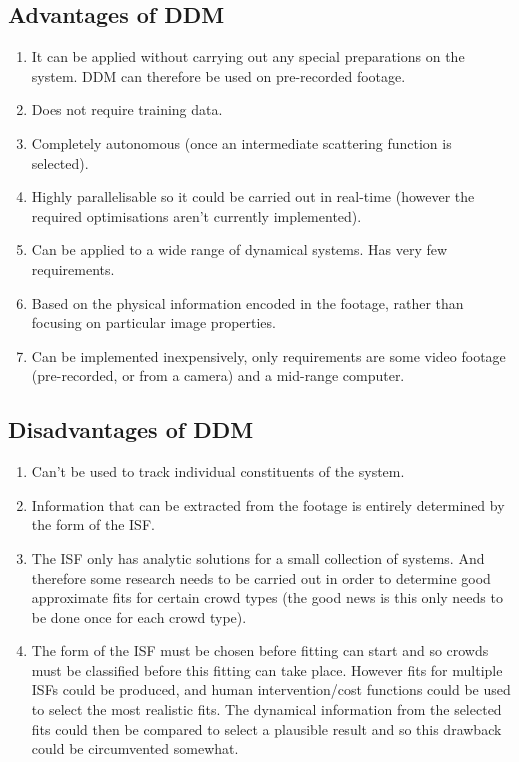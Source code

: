 \documentclass[10pt]{article}
\begin{document}
\subsection{Advantages of DDM}
\begin{enumerate}
\item It can be applied without carrying out any special preparations on the system. DDM can therefore be used on pre-recorded footage.
\item Does not require training data.
\item Completely autonomous (once an intermediate scattering function is selected).
\item Highly parallelisable so it could be carried out in real-time (however the required optimisations aren't currently implemented).
\item Can be applied to a wide range of dynamical systems. Has very few requirements.
\item Based on the physical information encoded in the footage, rather than focusing on particular image properties.
\item Can be implemented inexpensively, only requirements are some video footage (pre-recorded, or from a camera) and a mid-range computer.
\end{enumerate}

\subsection{Disadvantages of DDM}
\begin{enumerate}
\item Can't be used to track individual constituents of the system.
\item Information that can be extracted from the footage is entirely determined by the form of the ISF.
\item The ISF only has analytic solutions for a small collection of systems. And therefore some research needs to be carried out in order to determine good approximate fits for certain crowd types (the good news is this only needs to be done once for each crowd type).
\item The form of the ISF must be chosen before fitting can start and so crowds must be classified before this fitting can take place. However fits for multiple ISFs could be produced, and human intervention/cost functions could be used to select the most realistic fits. The dynamical information from the selected fits could then be compared to select a plausible result and so this drawback could be circumvented somewhat.
\end{enumerate}
 
\end{document}
